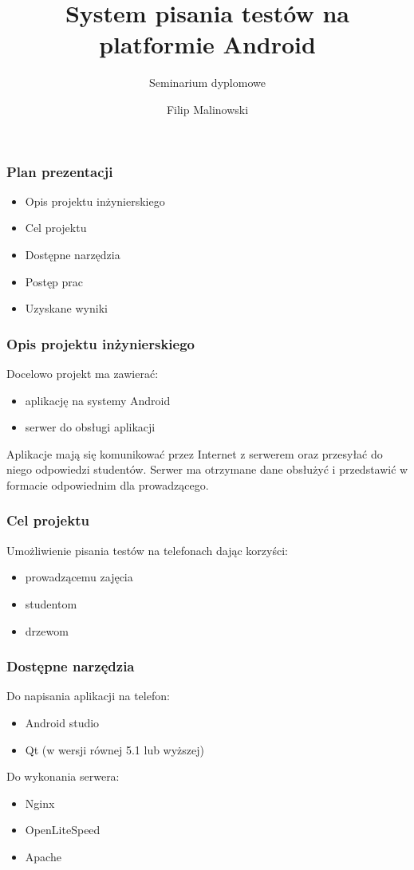 \documentclass{beamer}
\title
{System pisania testów na platformie Android}
\subtitle{Seminarium dyplomowe}
\author{Filip Malinowski}
\begin{document}
  \begin{frame}
	\titlepage
  \end{frame}
  \begin{frame}
    \frametitle{Plan prezentacji}
    \begin{itemize}
    \item Opis projektu inżynierskiego
    \item Cel projektu
    \item Dostępne narzędzia
    \item Postęp prac
    \item Uzyskane wyniki
    \end{itemize}
  \end{frame}
  \begin{frame}
    \frametitle{Opis projektu inżynierskiego}
    Docelowo projekt ma zawierać:
    \begin{itemize}
    \item aplikację na systemy Android
    \item serwer do obsługi aplikacji
    \end{itemize}
    Aplikacje mają się komunikować przez Internet z serwerem oraz przesyłać do
    niego odpowiedzi studentów. Serwer ma otrzymane dane obsłużyć i przedstawić
    w formacie odpowiednim dla prowadzącego.
    
  \end{frame}
  \begin{frame}
    \frametitle{Cel projektu}
    Umożliwienie pisania testów na telefonach dając korzyści:
    \begin{itemize}
    \item prowadzącemu zajęcia
    \item studentom
    \item drzewom
    \end{itemize}
   	
  \end{frame}
  \begin{frame}
    \frametitle{Dostępne narzędzia}
    Do napisania aplikacji na telefon:
    \begin{itemize}
    \item Android studio
    \item Qt (w wersji równej 5.1 lub wyższej)
    \end{itemize}
    Do wykonania serwera:
    \begin{itemize}
    \item Nginx
    \item OpenLiteSpeed
    \item Apache
    \end{itemize}
  \end{frame}
\end{document}
